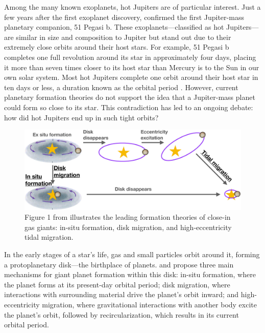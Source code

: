 \documentclass[oneside,12pt]{amsart}
\numberwithin{page}{section}
\begin{document}
Among the many known exoplanets, hot Jupiters are of particular interest. Just a few years after the first exoplanet discovery, \citet{mayor1995pegasi51b} confirmed the first Jupiter-mass planetary companion, 51 Pegasi b. These exoplanets—classified as hot Jupiters—are similar in size and composition to Jupiter but stand out due to their extremely close orbits around their host stars. For example, 51 Pegasi b completes one full revolution around its star in approximately four days, placing it more than seven times closer to its host star than Mercury is to the Sun in our own solar system. Most hot Jupiters complete one orbit around their host star in ten days or less, a duration known as the orbital period \citep{fortney2021hotjupiters}. However, current planetary formation theories do not support the idea that a Jupiter-mass planet could form so close to its star. This contradiction has led to an ongoing debate: how did hot Jupiters end up in such tight orbits?

\begin{figure}[htbp]
    \centering
    \includegraphics[width=\linewidth]{figs/hj_formation_theories.jpg}
    \caption{Figure 1 from \citet{fortney2021hotjupiters} illustrates the leading formation theories of close-in gas giants: in-situ formation, disk migration, and high-eccentricity tidal migration.}
    \label{fig:formation-theories}
\end{figure}

In the early stages of a star's life, gas and small particles orbit around it, forming a protoplanetary disk—the birthplace of planets. \citet{fortney2021hotjupiters} and \citet{dawson2018origins} propose three main mechanisms for giant planet formation within this disk: in-situ formation, where the planet forms at its present-day orbital period; disk migration, where interactions with surrounding material drive the planet’s orbit inward; and high-eccentricity migration, where gravitational interactions with another body excite the planet’s orbit, followed by recircularization, which results in its current orbital period.
\end{document}
